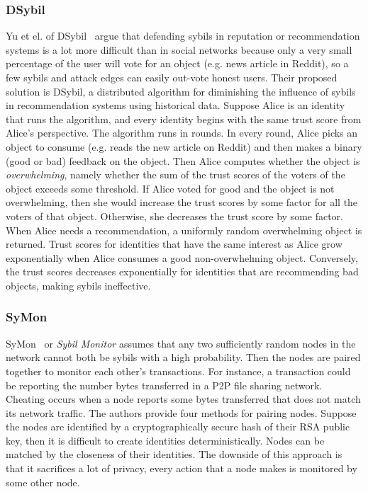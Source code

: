 \subsubsection{DSybil}
Yu et el. of DSybil~\cite{yu2009dsybil} argue that defending sybils in reputation
or recommendation systems is a lot more difficult than in social networks
because only a very small percentage of the user will vote for an object (e.g.
news article in Reddit), so a few sybils and attack edges can easily out-vote
honest users. Their proposed solution is DSybil, a distributed algorithm for
diminishing the influence of sybils in recommendation systems using historical
data. Suppose Alice is an identity that runs the algorithm, and every identity
begins with the same trust score from Alice's perspective. The algorithm runs in
rounds. In every round, Alice picks an object to consume (e.g. reads the new
article on Reddit) and then makes a binary (good or bad) feedback on the object.
Then Alice computes whether the object is \emph{overwhelming}, namely whether
the sum of the trust scores of the voters of the object exceeds some threshold.
If Alice voted for good and the object is not overwhelming, then she would
increase the trust scores by some factor for all the voters of that object.
Otherwise, she decreases the trust score by some factor. When Alice needs a
recommendation, a uniformly random overwhelming object is returned. Trust scores
for identities that have the same interest as Alice grow exponentially when
Alice consumes a good non-overwhelming object. Conversely, the trust scores
decreases exponentially for identities that are recommending bad objects, making
sybils ineffective.

\subsubsection{SyMon}
SyMon~\cite{jyothi2009symon} or \emph{Sybil Monitor} assumes that any two
sufficiently random nodes in the network cannot both be sybils with a high
probability. Then the nodes are paired together to monitor each other's
transactions. For instance, a transaction could be reporting the number bytes
transferred in a P2P file sharing network. Cheating occurs when a node reports
some bytes transferred that does not match its network traffic. The authors
provide four methods for pairing nodes. Suppose the nodes are identified by a
cryptographically secure hash of their RSA public key, then it is difficult to
create identities deterministically. Nodes can be matched by the closeness of
their identities. The downside of this approach is that it sacrifices a lot of
privacy, every action that a node makes is monitored by some other node.

